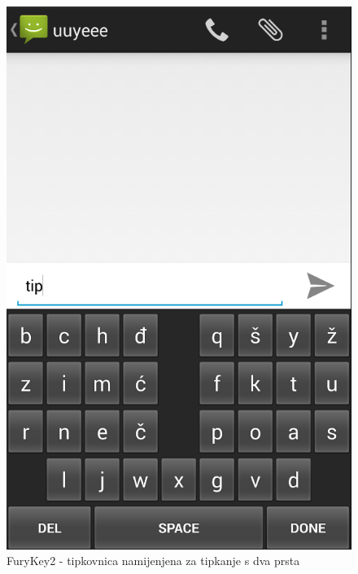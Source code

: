 \documentclass[times, utf8, zavrsni]{fer}
\begin{document}
\begin{figure}[htb]
\begin{minipage}[b]{0.48\textwidth}
    \includegraphics[width=\textwidth]{img/FuryKey2.PNG}
    \caption{FuryKey2 - tipkovnica namijenjena za tipkanje s dva prsta}
    \label{fig:FuryKey2}
  \end{minipage}
\end{figure}
\end{document}
